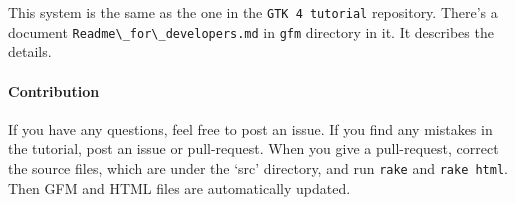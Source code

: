 This system is the same as the one in the
\passthrough{\lstinline!GTK 4 tutorial!} repository. There's a document
\passthrough{\lstinline!Readme\_for\_developers.md!} in
\passthrough{\lstinline!gfm!} directory in it. It describes the details.

\paragraph{Contribution}\label{contribution}

If you have any questions, feel free to post an issue. If you find any
mistakes in the tutorial, post an issue or pull-request. When you give a
pull-request, correct the source files, which are under the `src'
directory, and run \passthrough{\lstinline!rake!} and
\passthrough{\lstinline!rake html!}. Then GFM and HTML files are
automatically updated.
